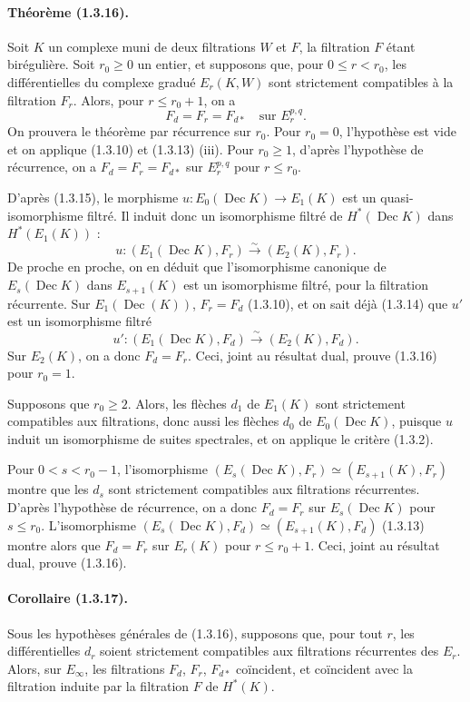 \documentclass[10pt]{article}
\newcommand{\iso}{\xrightarrow{\sim}}
\newcommand{\Dec}{\operatorname{Dec}}
\begin{document}
\paragraph{Théorème (1.3.16).} Soit $K$ un complexe muni de deux filtrations $W$ et $F$, la filtration $F$ étant birégulière. Soit $r_0\ge0$ un entier, et supposons que, pour $0\le r<r_0$, les différentielles du complexe gradué $E_r(K,W)$ sont strictement compatibles à la filtration $F_r$. Alors, pour $r\le r_0+1$, on a
\[
F_d=F_r=F_{d*}\quad\text{sur }E_r^{p,q}.
\]
On prouvera le théorème par récurrence sur $r_0$. Pour $r_0=0$, l'hypothèse est vide et on applique (1.3.10) et (1.3.13) (iii). Pour $r_0\ge1$, d'après l'hypothèse de récurrence, on a $F_d=F_r=F_{d*}$ sur $E_r^{p,q}$ pour $r\le r_0$.

D'après (1.3.15), le morphisme $u:E_0(\Dec K)\to E_1(K)$ est un quasi-isomorphisme filtré. Il induit donc un isomorphisme filtré de $H^*(\Dec K)$ dans $H^*(E_1(K))$ :
\[
u:(E_1(\Dec K),F_r)\iso(E_2(K),F_r).
\]
De proche en proche, on en déduit que l'isomorphisme canonique de $E_s(\Dec K)$ dans $E_{s+1}(K)$ est un isomorphisme filtré, pour la filtration récurrente. Sur $E_1(\Dec(K))$, $F_r=F_d$ (1.3.10), et on sait déjà (1.3.14) que $u'$ est un isomorphisme filtré
\[
u':(E_1(\Dec K),F_d)\iso(E_2(K),F_d).
\]
Sur $E_2(K)$, on a donc $F_d=F_r$. Ceci, joint au résultat dual, prouve (1.3.16) pour $r_0=1$.

Supposons que $r_0\ge2$. Alors, les flèches $d_1$ de $E_1(K)$ sont strictement compatibles aux filtrations, donc aussi les flèches $d_0$ de $E_0(\Dec K)$, puisque $u$ induit un isomorphisme de suites spectrales, et on applique le critère (1.3.2).

Pour $0<s<r_0-1$, l'isomorphisme $(E_s(\Dec K),F_r)\simeq(E_{s+1}(K),F_r)$ montre que les $d_s$ sont strictement compatibles aux filtrations récurrentes. D'après l'hypothèse de récurrence, on a donc $F_d=F_r$ sur $E_s(\Dec K)$ pour $s\le r_0$. L'isomorphisme $(E_s(\Dec K),F_d)\simeq(E_{s+1}(K),F_d)$ (1.3.13) montre alors que $F_d=F_r$ sur $E_r(K)$ pour $r\le r_0+1$. Ceci, joint au résultat dual, prouve (1.3.16).

\paragraph{Corollaire (1.3.17).} Sous les hypothèses générales de (1.3.16), supposons que, pour tout $r$, les différentielles $d_r$ soient strictement compatibles aux filtrations récurrentes des $E_r$. Alors, sur $E_\infty$, les filtrations $F_d$, $F_r$, $F_{d*}$ coïncident, et coïncident avec la filtration induite par la filtration $F$ de $H^*(K)$.
\end{document}
